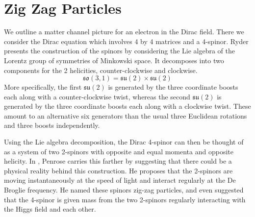 \documentclass[12pt,a4paper]{article}
\begin{document}
\section{Zig Zag Particles}
\label{ticktock}
We outline a matter channel picture for an electron in the Dirac field.  There we consider the Dirac equation which involves 4 by 4 matrices and a 4-spinor.  Ryder \cite{ryder} presents the construction of the spinors by considering the Lie algebra of the Lorentz group of symmetries of Minkowski space.  It decomposes into two components for the 2 helicities, counter-clockwise and clockwise.
\[
\mathfrak{so(3,1)} = \mathfrak{su(2)} \times \mathfrak{su(2)}
\]
More specifically, the first $\mathfrak{su(2)}$ is generated by the three coordinate boosts each along with a counter-clockwise twist, whereas the second $\mathfrak{su(2)}$ is generated by the three coordinate boosts each along with a clockwise twist.  These amount to an alternative six generators than the usual three Euclidean rotations and three boosts independently.

Using the Lie algebra decomposition, the Dirac 4-spinor can then be thought of as a system of two 2-spinors with opposite and equal momenta and opposite helicity.  In \cite{penrose}, Penrose carries this farther by suggesting that there could be a physical reality behind this construction.  He proposes that the 2-spinors are moving instantaneously at the speed of light and interact regularly at the De Broglie frequency.  He named these spinors zig-zag particles, and even suggested that the 4-spinor is given mass from the two 2-spinors regularly interacting with the Higgs field and each other.
\end{document}
